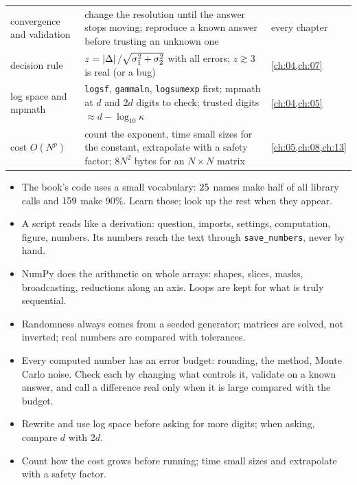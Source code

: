 \begin{center}
\begin{tabularx}{\linewidth}{@{}>{\raggedright\arraybackslash}p{3.2cm}
                               >{\raggedright\arraybackslash}X
                               >{\raggedright\arraybackslash}p{2.5cm}@{}}
convergence and validation & change the resolution until the answer stops moving; reproduce a known answer before trusting an unknown one & every chapter\\
decision rule & $z=\left\lvert \Delta\right\rvert/\sqrt{\sigma_1^2+\sigma_2^2}$ with all errors; $z\gtrsim3$ is real (or a bug) & \cref{ch:04,ch:07}\\
log space and mpmath & \texttt{logsf}, \texttt{gammaln}, \texttt{logsumexp} first; mpmath at $d$ and $2d$ digits to check; trusted digits $\approx d-\log_{10}\kappa$ & \cref{ch:04,ch:05}\\
cost $O(N^p)$ & count the exponent, time small sizes for the constant, extrapolate with a safety factor; $8N^2$ bytes for an $N\times N$ matrix & \cref{ch:05,ch:08,ch:13}\\
\bottomrule
\end{tabularx}
\end{center}

\begin{recap}
\begin{itemize}[leftmargin=1.2em,itemsep=1pt]
  \item The book's code uses a small vocabulary: $25$ names make half of all library calls and $159$ make $90\%$. Learn those; look up the rest when they appear.
  \item A script reads like a derivation: question, imports, settings, computation, figure, numbers. Its numbers reach the text through \texttt{save\_numbers}, never by hand.
  \item NumPy does the arithmetic on whole arrays: shapes, slices, masks, broadcasting, reductions along an axis. Loops are kept for what is truly sequential.
  \item Randomness always comes from a seeded generator; matrices are solved, not inverted; real numbers are compared with tolerances.
  \item Every computed number has an error budget: rounding, the method, Monte Carlo noise. Check each by changing what controls it, validate on a known answer, and call a difference real only when it is large compared with the budget.
  \item Rewrite and use log space before asking for more digits; when asking, compare $d$ with $2d$.
  \item Count how the cost grows before running; time small sizes and extrapolate with a safety factor.
\end{itemize}
\end{recap}

